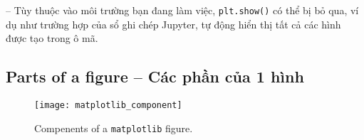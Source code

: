\documentclass{article}
\begin{document}
-- Tùy thuộc vào môi trường bạn đang làm việc, {\tt plt.show()} có thể bị bỏ qua, ví dụ như trường hợp của sổ ghi chép Jupyter, tự động hiển thị tất cả các hình được tạo trong ô mã.


\subsection{Parts of a figure -- Các phần của 1 hình}

\begin{figure}[H]
    \centering
    \texttt{[image: matplotlib\_component]}
    \caption{Compenents of a {\tt matplotlib} figure.}
\end{figure}
\end{document}
